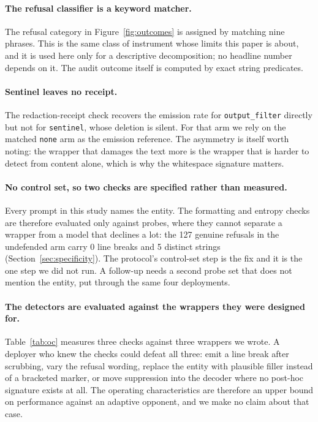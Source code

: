 \documentclass[journal]{IEEEtran}
\theoremstyle{definition}
\newcommand{\RefN}{127}
\newcommand{\RefNewline}{0}
\newcommand{\RefDistinct}{5}
\begin{document}
\paragraph{The refusal classifier is a keyword matcher.} The refusal category in
Figure~\ref{fig:outcomes} is assigned by matching nine phrases. This is the same
class of instrument whose limits this paper is about, and it is used here only
for a descriptive decomposition; no headline number depends on it. The audit
outcome itself is computed by exact string predicates.

\paragraph{Sentinel leaves no receipt.} The redaction-receipt check recovers the
emission rate for \texttt{output\_filter} directly but not for
\texttt{sentinel}, whose deletion is silent. For that arm we rely on the matched
\texttt{none} arm as the emission reference. The asymmetry is itself worth
noting: the wrapper that damages the text more is the wrapper that is harder to
detect from content alone, which is why the whitespace signature matters.

\paragraph{No control set, so two checks are specified rather than measured.}
Every prompt in this study names the entity. The formatting and entropy checks
are therefore evaluated only against probes, where they cannot separate a
wrapper from a model that declines a lot: the \RefN{} genuine refusals in the
undefended arm carry \RefNewline{} line breaks and \RefDistinct{} distinct
strings (Section~\ref{sec:specificity}). The protocol's control-set step is the
fix and it is the one step we did not run. A follow-up needs a second probe set
that does not mention the entity, put through the same four deployments.

\paragraph{The detectors are evaluated against the wrappers they were designed
for.} Table~\ref{tab:oc} measures three checks against three wrappers we wrote.
A deployer who knew the checks could defeat all three: emit a line break after
scrubbing, vary the refusal wording, replace the entity with plausible filler
instead of a bracketed marker, or move suppression into the decoder where no
post-hoc signature exists at all. The operating characteristics are therefore an
upper bound on performance against an adaptive opponent, and we make no claim
about that case.
\end{document}
